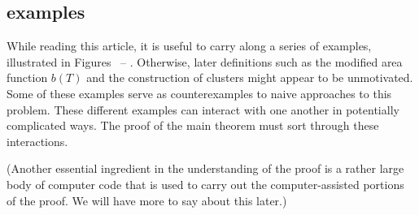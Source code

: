 \subsection{examples}

While reading this article, it is useful to carry along a series of examples,
illustrated in Figures~ -- .
Otherwise, later definitions such as the modified area function $b(T)$
and the construction of clusters might appear to be unmotivated.  Some
of these examples serve as counterexamples to naive approaches to this
problem.  These different examples can interact with one another in
potentially complicated ways.  The proof of the main theorem must sort
through these interactions.

(Another essential ingredient in the understanding of the proof is a
rather large body of computer code that is used to carry out the
computer-assisted portions of the proof.  We will have more to say
about this later.)



